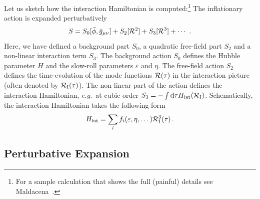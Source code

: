 \documentclass[12pt,letterpaper,rotate]{article}
\def\beq{\begin{equation}}
\def\eeq{\end{equation}}
\def\d{{\rm d}}
\def\R{{\cal R}}
\begin{document}
{Let us sketch how the interaction Hamiltonian is computed:\footnote{For a sample calculation that shows the full (painful) details see Maldacena~\cite{malda}.}
The inflationary action is expanded perturbatively
\beq
S = S_0[\bar \phi, \bar g_{\mu \nu}] + S_2[\R^2] + S_3[\R^3] + \cdots \ .
\eeq
Here, we have defined a background part $S_0$, a quadratic free-field part $S_2$ and a non-linear interaction term $S_3$.
The background action $S_0$ defines the Hubble parameter $H$ and the slow-roll parameters $\varepsilon$ and $\eta$.
The free-field action $S_2$ defines the time-evolution of the mode functions $\R(\tau)$ in the interaction picture (often denoted by $\R_{\rm I}(\tau)$).
The non-linear part of the action defines the interaction Hamiltonian, {\it e.g.}~at cubic order $S_3 = - \int \d \tau H_{\rm int}(\R_{\rm I})$.
Schematically, the interaction Hamiltonian takes the following form
\beq
H_{\rm int} = \sum_i f_i(\varepsilon, \eta, \dots) \R_{\rm I}^3(\tau)\, .
\eeq



\subsection{Perturbative Expansion}

}
\end{document}
